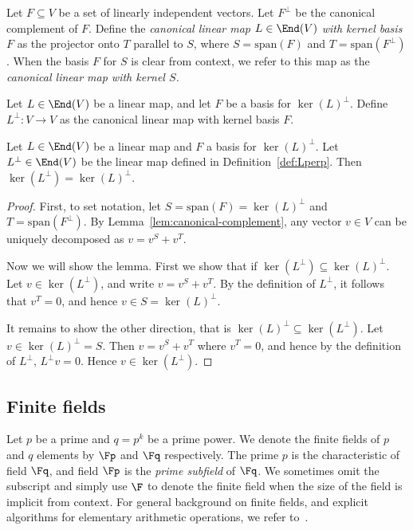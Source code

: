 \begin{definition}
  \label{def:cl-canonical}
  Let $F \subseteq V$ be a set of linearly independent vectors.
  Let $F^\perp$ be the canonical complement of $F$.
  Define the \emph{canonical linear map $L \in \End(V)$ with kernel basis $F$}
  as the projector onto $T$ parallel to $S$, where $S = \mathrm{span}(F)$ and $T
  = \mathrm{span}(F^\perp)$.
  When the basis $F$ for $S$ is clear from context, we refer to this map as the
  \emph{canonical linear map with kernel $S$.}
\end{definition}

\begin{definition}
  \label{def:Lperp}
  Let $L \in \End(V)$ be a linear map, and let $F$ be a basis for
  $\ker(L)^\perp$.
  Define $L^\perp : V \rightarrow V$ as the canonical linear map with kernel
  basis $F$.
\end{definition}

\begin{lemma}
  \label{lem:L_perp_perp}
  Let $L \in \End(V)$ be a linear map and $F$ a basis for $\ker(L)^\perp$.
  Let $L^\perp \in \End(V)$ be the linear map defined in
  Definition~\ref{def:Lperp}.
  Then $\ker(L^\perp) = \ker(L)^\perp$.
\end{lemma}

\begin{proof}
  First, to set notation, let $S = \mathrm{span}(F) = \ker(L)^\perp$ and $T =
  \mathrm{span}(F^\perp)$. By Lemma~\ref{lem:canonical-complement},
  any vector $v \in V$ can be uniquely decomposed as $v = v^S +
  v^T$. 

  Now we will show the lemma.  First we show that if $\ker(L^\perp) \subseteq \ker(L)^\perp$. Let
  $v \in \ker(L^\perp)$, and write $v = v^S + v^T$.  By the definition
  of $L^\perp$, it follows that $v^T = 0$, and hence $v \in S = \ker(L)^\perp$.

  It remains to show the other direction, that is $\ker(L)^\perp \subseteq
  \ker(L^\perp)$. Let $v \in \ker(L)^\perp = S$. Then $v = v^S + v^T$
  where $v^T = 0$, and hence by the definition of $L^\perp$, $L^\perp
  v = 0$. Hence $v \in \ker(L^\perp)$.

  
\end{proof}

\subsection{Finite fields}
\label{sec:finite-fields}

Let $p$ be a prime and $q = p^k$ be a prime power.
We denote the finite fields of $p$ and $q$ elements by $\Fp$ and $\Fq$
respectively.
The prime $p$ is the characteristic of field $\Fq$, and field $\Fp$ is the
\emph{prime subfield} of $\Fq$.
We sometimes omit the subscript and simply use $\F$ to denote the finite field
when the size of the field is implicit from context.
For general background on finite fields, and explicit algorithms for elementary
arithmetic operations, we refer to~\cite{mullen2013handbook}.


